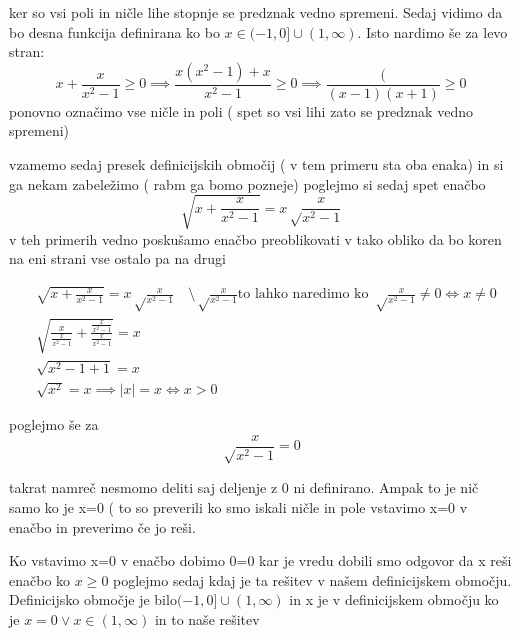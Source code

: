 \documentclass[a4paper]{article}
\begin{document}
 ker so vsi poli in ničle lihe stopnje se predznak vedno spremeni. Sedaj vidimo da bo desna funkcija definirana ko bo \(x\in(-1,0]\cup(1,\infty)\). Isto nardimo še za levo stran:
\[
x+\frac{x}{x^{2}-1}\geq0\implies\frac{x(x^{2}-1)+x}{x^{2}-1}\geq0\implies\frac{(}{(x-1)(x+1)}\geq0
\]
ponovno označimo vse ničle in poli ( spet so vsi lihi zato se predznak vedno spremeni)\\
\begin{center}
 \end{center}
vzamemo sedaj presek definicijskih območij ( v tem primeru sta oba enaka) in si ga nekam zabeležimo ( rabm ga bomo pozneje)
\newpage
poglejmo si sedaj spet enačbo
\[
\sqrt{x+\frac{x}{x^{2}-1}}=x\sqrt\frac{x}{x^{2}-1}
\]
v teh primerih  vedno poskušamo enačbo preoblikovati v tako obliko da bo koren na eni strani vse ostalo pa na drugi

\begin{align*}
&\sqrt{x+\frac{x}{x^{2}-1}}=x\sqrt\frac{x}{x^{2}-1}\quad \setminus\sqrt\frac{x}{x^{2}-1}\text{to lahko naredimo ko \(\sqrt\frac{x}{x^{2}-1}\neq0\Leftrightarrow x\neq0\)}
\\
&\sqrt{\frac{x}{\frac{x}{x^{2}-1}}+\frac{\frac{x}{x^{2}-1}}{\frac{x}{x^{2}-1}}}=x\\
&\sqrt{x^{2}-1+1}=x\\
&\sqrt{x^{2}}=x\implies|x|=x\Leftrightarrow x>0
\end{align*}

poglejmo še za
\[
\sqrt\frac{x}{x^{2}-1}=0
\]

takrat namreč nesmomo deliti saj deljenje z 0 ni definirano. Ampak to je nič samo ko je x=0 ( to so preverili ko smo iskali ničle in pole vstavimo x=0 v enačbo in preverimo če jo reši.

Ko vstavimo x=0 v enačbo dobimo 0=0 kar je vredu
\vspace{0.2cm}
dobili smo odgovor da x reši enačbo ko \(x\geq0\) poglejmo sedaj kdaj je ta rešitev v našem definicijskem območju. Definicijsko območje je bilo\((-1,0]\cup(1,\infty)\) in x je v definicijskem območju ko je \(x=0\lor x\in(1,\infty)\) in to naše rešitev
\end{document}
